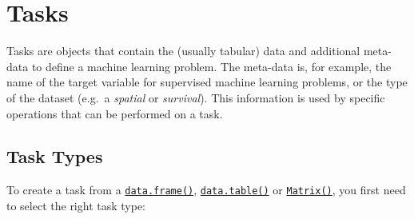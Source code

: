 \documentclass[
]{scrbook}
\begin{document}
\hypertarget{tasks}{%
\section{Tasks}\label{tasks}}

Tasks are objects that contain the (usually tabular) data and additional meta-data to define a machine learning problem.
The meta-data is, for example, the name of the target variable for supervised machine learning problems, or the type of the dataset (e.g.~a \emph{spatial} or \emph{survival}).
This information is used by specific operations that can be performed on a task.

\hypertarget{tasks-types}{%
\subsection{Task Types}\label{tasks-types}}

To create a task from a \href{https://www.rdocumentation.org/packages/base/topics/data.frame}{\texttt{data.frame()}}, \href{https://www.rdocumentation.org/packages/data.table/topics/data.table-package}{\texttt{data.table()}} or \href{https://www.rdocumentation.org/packages/Matrix/topics/Matrix}{\texttt{Matrix()}}, you first need to select the right task type:
\end{document}
